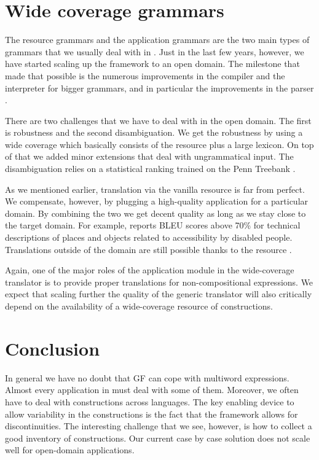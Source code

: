 \documentclass[output=paper]{langsci/langscibook}
\begin{document}
\section{Wide coverage grammars} 

The resource grammars and the application grammars are the two main
types of grammars that we usually deal with in . Just in the last
few years, however, we have started scaling up the framework to 
an open domain. The milestone that made that possible is the numerous
improvements in the compiler and the interpreter for bigger grammars, and in particular the improvements in the  parser \citep{angelov2011mechanics}.

There are two challenges that we have to deal with in the open domain.
The first is robustness and the second disambiguation. We get the robustness
by using a wide coverage  which basically consists of 
the resource  plus a large lexicon. On top of that we added
minor extensions that deal with ungrammatical input. The disambiguation
relies on a statistical ranking trained on the Penn Treebank \citep{angelov2011mechanics}.

As we mentioned earlier, translation via the vanilla resource 
is far from perfect. We compensate, however, by plugging a high-quality
application  for a particular domain. By combining the two
we get decent quality as long as we stay close to the target domain.
For example, \cite{ranta2015grammar} reports BLEU scores above 70\%
for technical descriptions of places and objects related to accessibility
by disabled people.
Translations outside of the domain are still possible thanks to the
resource . 

Again, one of the major roles of the application module in 
the wide-coverage translator is to provide proper translations
for non-compositional expressions. We expect that scaling 
further the quality of the generic translator will also critically
depend on the availability of a wide-coverage resource of constructions.

\section{Conclusion}

In general we have no doubt that GF can cope
with multiword expressions. Almost every application  in 
must deal with some of them. Moreover, we often have to deal with
constructions across languages. The key enabling device to allow
variability in the constructions is the fact that the framework
allows for discontinuities. The interesting challenge that we see,
however, is how to collect a good inventory of constructions.
Our current case by case solution does not scale well for open-domain
applications.


{\sloppy\printbibliography[heading=subbibliography,notkeyword=this]}
\end{document}
